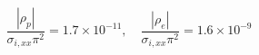 $$
\frac{|\rho_p|}{\sigma_{i,xx}\pi^2} = 1.7\times10^{-11},\quad \frac{|\rho_e|}{\sigma_{i,xx}\pi^2} = 1.6\times10^{-9}
$$
